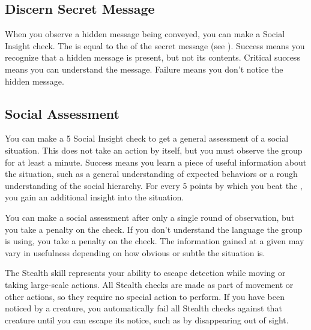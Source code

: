     \subsection{Discern Secret Message}
        When you observe a hidden message being conveyed, you can make a Social Insight check.
        The  is equal to the  of the secret message (see ).
        Success means you recognize that a hidden message is present, but not its contents.
        Critical success means you can understand the message.
        Failure means you don't notice the hidden message.

    \subsection{Social Assessment}\label{Social Assessment}
        You can make a  5 Social Insight check to get a general assessment of a social situation.
        This does not take an action by itself, but you must observe the group for at least a minute.
        Success means you learn a piece of useful information about the situation, such as a general understanding of expected behaviors or a rough understanding of the social hierarchy.
        For every 5 points by which you beat the , you gain an additional insight into the situation.

        You can make a social assessment after only a single round of observation, but you take a  penalty on the check.
        If you don't understand the language the group is using, you take a  penalty on the check.
        The information gained at a given  may vary in usefulness depending on how obvious or subtle the situation is.

\newpage
{}
        The Stealth skill represents your ability to escape detection while moving or taking large-scale actions.
        All Stealth checks are made as part of movement or other actions, so they require no special action to perform. If you have been noticed by a creature, you automatically fail all Stealth checks against that creature until you can escape its notice, such as by disappearing out of sight.

